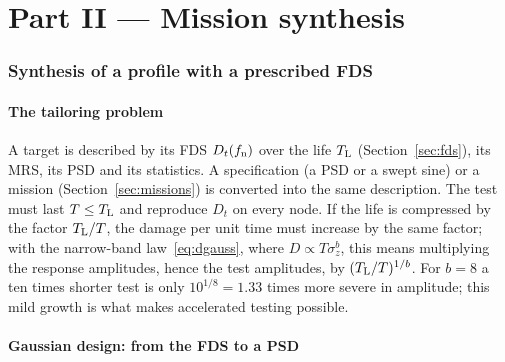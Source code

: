 \part*{Part II --- Mission synthesis}

\section{Synthesis of a profile with a prescribed FDS}\label{sec:synthesis}

\subsection{The tailoring problem}

A target is described by its FDS $D_t(f_{\mathrm{n}})$ over the life $T_{\mathrm{L}}$ (Section~\ref{sec:fds}), its MRS,
its PSD and its statistics. A specification (a PSD or a swept sine) or a mission
(Section~\ref{sec:missions}) is converted into the same description. The test must last $T\le T_{\mathrm{L}}$ and
reproduce $D_t$ on every node. If the life is compressed by the factor $T_{\mathrm{L}}/T$, the damage per unit
time must increase by the same factor; with the narrow-band law~\eqref{eq:dgauss}, where $D\propto
T\sigma_z^b$, this means multiplying the response amplitudes, hence the test amplitudes, by
$(T_{\mathrm{L}}/T)^{1/b}$. For $b=8$ a ten times shorter test is only $10^{1/8} = 1.33$ times more severe in
amplitude; this mild growth is what makes accelerated testing possible.

\subsection{Gaussian design: from the FDS to a PSD}\label{sec:inversion}

